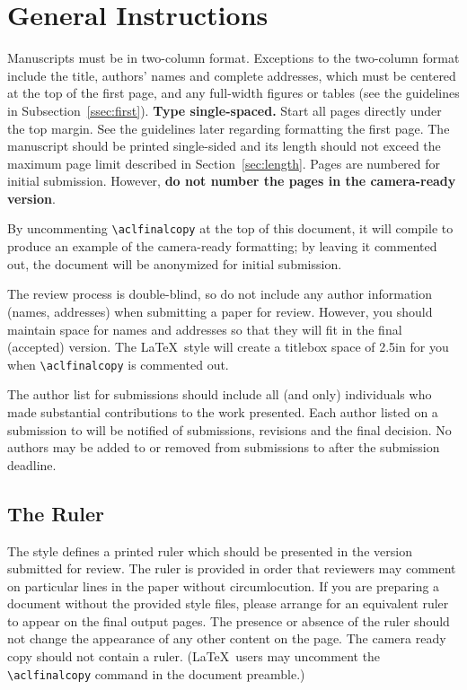 \section{General Instructions}

Manuscripts must be in two-column format.  Exceptions to the two-column format include the title, authors' names and complete addresses, which must be centered at the top of the first page, and any full-width figures or tables (see the guidelines in
Subsection~\ref{ssec:first}). {\bf Type single-spaced.}  Start all pages directly under the top margin. See the guidelines later regarding formatting the first page.  The manuscript should be printed single-sided and its length should not exceed the maximum page limit described in Section~\ref{sec:length}.
Pages are numbered for  initial submission. However, {\bf do not number the pages in the camera-ready version}.

By uncommenting {\small\verb|\aclfinalcopy|} at the top of this document, it will compile to produce an example of the camera-ready formatting; by leaving it commented out, the document will be anonymized for initial submission.

The review process is double-blind, so do not include any author information (names, addresses) when submitting a paper for review. However, you should maintain space for names and addresses so that they will fit in the final (accepted) version.  The \confname{} \LaTeX\ style will create a titlebox space of 2.5in for you when {\small\verb|\aclfinalcopy|} is commented out.  

The author list for submissions should include all (and only) individuals who made substantial contributions to the work presented. Each author listed on a submission to \confname{} will be notified of submissions, revisions and the final decision. No authors may be added to or removed from submissions to \confname{} after the submission deadline.

\subsection{The Ruler} The \confname{} style defines a printed ruler which should be presented in the version submitted for review.  The ruler is provided in order that reviewers may comment on particular lines in the paper without circumlocution.  If you are preparing a document without the provided style files, please arrange for an equivalent ruler to appear on the final output pages.  The presence or absence of the ruler should not change the appearance of any other content on the page.  The camera ready copy should not contain a ruler. (\LaTeX\ users may uncomment the {\small\verb|\aclfinalcopy|} command in the document preamble.)  

